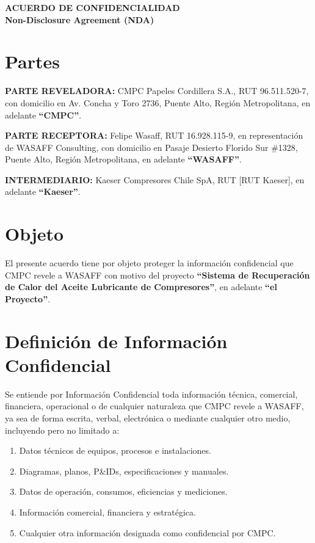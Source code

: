 \documentclass[11pt,a4paper]{article}
\begin{document}
\begin{center}
{\LARGE\bfseries\textcolor{wasaffblue}{ACUERDO DE CONFIDENCIALIDAD}}\\[0.5cm]
{\large\textbf{Non-Disclosure Agreement (NDA)}}\\[1cm]
\end{center}

\section*{Partes}

\textbf{PARTE REVELADORA:} CMPC Papeles Cordillera S.A., RUT 96.511.520-7, con domicilio en Av. Concha y Toro 2736, Puente Alto, Región Metropolitana, en adelante \textbf{``CMPC''}.

\textbf{PARTE RECEPTORA:} Felipe Wasaff, RUT 16.928.115-9, en representación de WASAFF Consulting, con domicilio en Pasaje Desierto Florido Sur \#1328, Puente Alto, Región Metropolitana, en adelante \textbf{``WASAFF''}.

\textbf{INTERMEDIARIO:} Kaeser Compresores Chile SpA, RUT [RUT Kaeser], en adelante \textbf{``Kaeser''}.

\section*{Objeto}

El presente acuerdo tiene por objeto proteger la información confidencial que CMPC revele a WASAFF con motivo del proyecto \textbf{``Sistema de Recuperación de Calor del Aceite Lubricante de Compresores''}, en adelante \textbf{``el Proyecto''}.

\section*{Definición de Información Confidencial}

Se entiende por Información Confidencial toda información técnica, comercial, financiera, operacional o de cualquier naturaleza que CMPC revele a WASAFF, ya sea de forma escrita, verbal, electrónica o mediante cualquier otro medio, incluyendo pero no limitado a:

\begin{enumerate}
  \item Datos técnicos de equipos, procesos e instalaciones.
  \item Diagramas, planos, P\&IDs, especificaciones y manuales.
  \item Datos de operación, consumos, eficiencias y mediciones.
  \item Información comercial, financiera y estratégica.
  \item Cualquier otra información designada como confidencial por CMPC.
\end{enumerate}
\end{document}

